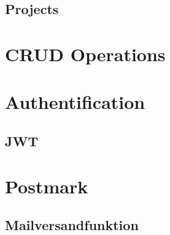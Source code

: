 \subsection{Projects}


\section{CRUD Operations}


\section{Authentification}


\subsection{JWT}


\section{Postmark}


\subsection{Mailversandfunktion}

